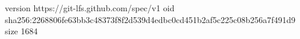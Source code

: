 version https://git-lfs.github.com/spec/v1
oid sha256:2268806fe63bb3c48373f8f2d539d4edbc0cd451b2af5c225c08b256a7f491d9
size 1684
